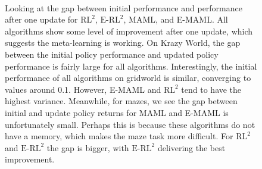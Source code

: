 \documentclass{article} %
\begin{document}
\begin{figure}[H]
\begin{center}
\\
\hfill
{}
\end{center}
\caption{Looking at the gap between initial performance and performance after one update for $\text{RL}^2$, $\text{E-RL}^2$, MAML, and E-MAML. All algorithms show some level of improvement after one update, which suggests the meta-learning is working. On Krazy World, the gap between the initial policy performance and updated policy performance is fairly large for all algorithms. Interestingly, the initial performance of all algorithms on gridworld is similar, converging to values around 0.1. However, E-MAML and $\text{RL}^2$ tend to have the highest variance. Meanwhile, for mazes, we see the gap between initial and update policy returns for MAML and E-MAML is unfortunately small. Perhaps this is because these algorithms do not have a memory, which makes the maze task more difficult. For $\text{RL}^2$ and $\text{E-RL}^2$ the gap is bigger, with $\text{E-RL}^2$ delivering the best improvement.}
\label{fig:gaps}
\end{figure} 
\end{document}
